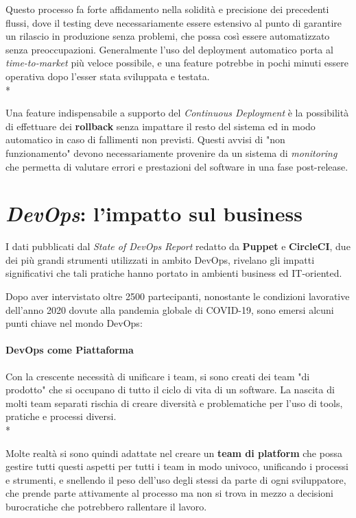 \documentclass[../main.tex]{subfiles}
\begin{document}
        			Questo processo fa forte affidamento nella solidità e precisione dei precedenti flussi, dove il testing deve necessariamente essere estensivo al punto di garantire un rilascio in produzione senza problemi, che possa così essere automatizzato senza preoccupazioni. Generalmente l'uso del deployment automatico porta al \emph{time-to-market} più veloce possibile, e una feature potrebbe in pochi minuti essere operativa dopo l'esser stata sviluppata e testata.\\*
        			
        			Una feature indispensabile a supporto del \emph{Continuous Deployment} è la possibilità di effettuare dei \textbf{rollback} senza impattare il resto del sistema ed in modo automatico in caso di fallimenti non previsti. Questi avvisi di "non funzionamento" devono necessariamente provenire da un sistema di \emph{monitoring} che permetta di valutare errori e prestazioni del software in una fase post-release.
        			
        \section{\emph{DevOps}: l'impatto sul business}
            
            I dati pubblicati dal \emph{State of DevOps Report}\cite{state_of_devops_report_2020} redatto da \textbf{Puppet} e \textbf{CircleCI}, due dei più grandi strumenti utilizzati in ambito DevOps, rivelano gli impatti significativi che tali pratiche hanno portato in ambienti business ed IT-oriented.
            
            Dopo aver intervistato oltre 2500 partecipanti, nonostante le condizioni lavorative dell'anno 2020 dovute alla pandemia globale di COVID-19, sono emersi alcuni punti chiave nel mondo DevOps:
            
            \paragraph{DevOps come Piattaforma}
            Con la crescente necessità di unificare i team, si sono creati dei team "di prodotto" che si occupano di tutto il ciclo di vita di un software. La nascita di molti team separati rischia di creare diversità e problematiche per l'uso di tools, pratiche e processi diversi.\\*
            
            Molte realtà si sono quindi adattate nel creare un \textbf{team di platform} che possa gestire tutti questi aspetti per tutti i team in modo univoco, unificando i processi e strumenti, e snellendo il peso dell'uso degli stessi da parte di ogni sviluppatore, che prende parte attivamente al processo ma non si trova in mezzo a decisioni burocratiche che potrebbero rallentare il lavoro.
            
\end{document}
